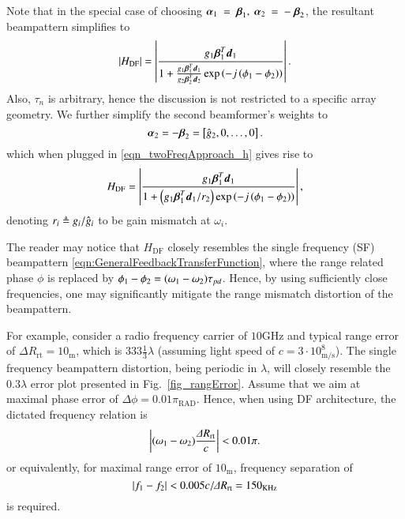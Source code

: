 Note that in the special case of choosing $\vAlphaI{1}~=~\vBetaI{1},\ \vAlphaI{2}~=~-~\vBetaI{2}$, the resultant beampattern simplifies to
\begin{equation}
    \label{eqn_twoFreqApproach_h}
    \abs{H_{\text{DF}}} = \lBrace{\frac{\gI{1}\vBetaTI{1}\vdI{1}}{1+\frac{\gI{1}\vBetaTI{1}\vdI{1}}{\gI{2}\vBetaTI{2}\vdI{2}}\exp{\rBrace{-j\rBrace{\phiI{1}-\phiI{2}}}}}}.
\end{equation}
Also, $\tau_n$ is arbitrary, hence the discussion is not restricted to a specific array geometry.
We further simplify the second beamformer's weights to 
\begin{equation}\label{eq_simpleBeta}
    \vAlphaI{2}=-\vBetaI{2}=\vBrace{\gIHat{2},0,\hdots,0}.
\end{equation}
which when plugged in \eqref{eqn_twoFreqApproach_h} gives rise to 
\begin{equation}
    H_{\text{DF}} = \lBrace{\frac{\gI{1}\vBetaTI{1}\vdI{1}}{1+
    \rBrace{\gI{1}\vBetaTI{1}\vdI{1}/r_{2}}\exp\rBrace{-j\rBrace{\phiI{1}-\phiI{2}}}
    }},
    \label{eq_H_DF_general}
\end{equation}
denoting $r_i\triangleq{}g_{i}/\hat{g}_{i}$ to be gain mismatch at $\omega_i$. 
\par The reader may notice that $H_{\text{DF}}$ closely resembles the single frequency (SF) beampattern \eqref{eqn:GeneralFeedbackTransferFunction}, where the range related phase $\phi$ is replaced by $\phi_{1}-\phi_{2}=(\omega_1-\omega_2)\tau_{pd}$. Hence, by using sufficiently close frequencies, one may significantly mitigate the range mismatch distortion of the beampattern.
\par For example, consider a radio frequency carrier of $10\text{GHz}$ and typical range error of $\Delta{}R_{\text{rt}}=10_{\text{m}}$, which is $333\frac{1}{3}\lambda$ (assuming light speed of $c=3\cdot 10^{8}_{\text{m/s}}$). The single frequency beampattern distortion, being periodic in $\lambda$, will closely resemble the $0.3\lambda$ error plot presented in Fig.~\ref{fig_rangError}. Assume that we aim at maximal phase error of $\Delta \phi=0.01\pi_{\text{RAD}}$. Hence, when using DF architecture, the dictated frequency relation is
\begin{equation}\label{eq_DF_phErr}
\abs{(\omega_1-\omega_2)\frac{\Delta{}R_{\text{rt}}}{c}}<0.01\pi.
\end{equation}
or equivalently, for maximal range error of $10_\text{m}$, frequency separation of
\[
\left\vert f_1-f_2\right\vert<0.005 c/\Delta{}R_{\text{rt}}=150_{\text{KHz}}
\]
is required. 

